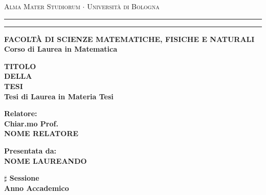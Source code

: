 \documentclass[12pt,a4paper]{report}
\begin{document}
\begin{titlepage}
\begin{center}
{{\Large{\textsc{Alma Mater Studiorum $\cdot$ Universit\`a di
Bologna}}}} \rule[0.1cm]{15.8cm}{0.1mm}
\rule[0.5cm]{15.8cm}{0.6mm}
{\small{\bf FACOLT\`A DI SCIENZE MATEMATICHE, FISICHE E NATURALI\\
Corso di Laurea in Matematica}}
\end{center}
\vspace{15mm}
\begin{center}
{\LARGE{\bf TITOLO}}\\
\vspace{3mm}
{\LARGE{\bf DELLA}}\\
\vspace{3mm}
{\LARGE{\bf TESI}}\\
\vspace{19mm} {\large{\bf Tesi di Laurea in Materia Tesi}}
\end{center}
\vspace{30mm}
\par
\noindent
\begin{minipage}[t]{0.47\textwidth}
{\large{\bf Relatore:\\
Chiar.mo Prof.\\
NOME RELATORE}}
\end{minipage}
\hfill
\begin{minipage}[t]{0.47\textwidth}\raggedleft
{\large{\bf Presentata da:\\
NOME LAUREANDO}}
\end{minipage}
\vspace{15mm}
\par
{}
\vspace{15mm}
\begin{center}
{\large{\bf $\sharp$ Sessione\\
Anno Accademico }}
\end{center}
\end{titlepage}
\end{document}
